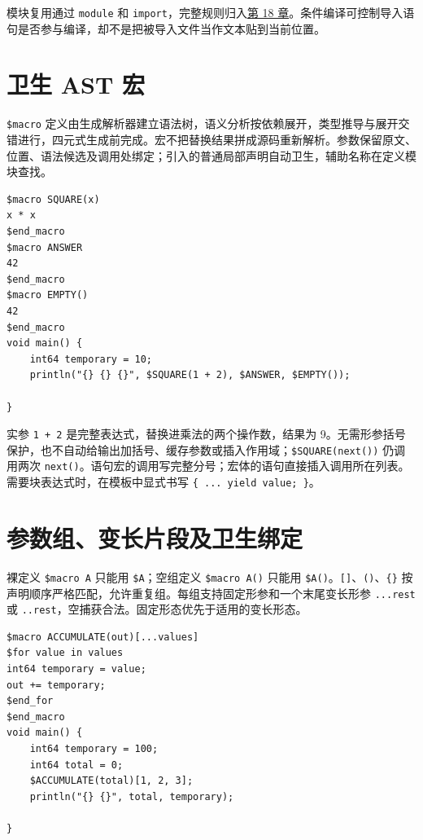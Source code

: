 模块复用通过 \texttt{module} 和 \texttt{import}，完整规则归入\hyperref[ch:18]{第 18 章}。条件编译可控制导入语句是否参与编译，却不是把被导入文件当作文本贴到当前位置。

\section{卫生 AST 宏}

\texttt{\$macro} 定义由生成解析器建立语法树，语义分析按依赖展开，类型推导与展开交错进行，四元式生成前完成。宏不把替换结果拼成源码重新解析。参数保留原文、位置、语法候选及调用处绑定；引入的普通局部声明自动卫生，辅助名称在定义模块查找。

\par
\medskip
\begin{lstlisting}[style=chali]
$macro SQUARE(x)
x * x
$end_macro
$macro ANSWER
42
$end_macro
$macro EMPTY()
42
$end_macro
void main() {
    int64 temporary = 10;
    println("{} {} {}", $SQUARE(1 + 2), $ANSWER, $EMPTY());

}
\end{lstlisting}
\par
\medskip

实参 \texttt{1 + 2} 是完整表达式，替换进乘法的两个操作数，结果为 9。无需形参括号保护，也不自动给输出加括号、缓存参数或插入作用域；\texttt{\$SQUARE(\allowbreak{}next(\allowbreak{})\allowbreak{})\allowbreak{}} 仍调用两次 \texttt{next(\allowbreak{})\allowbreak{}}。语句宏的调用写完整分号；宏体的语句直接插入调用所在列表。需要块表达式时，在模板中显式书写 \texttt{\{ .\allowbreak{}.\allowbreak{}.\allowbreak{} yield value; \}}。

\section{参数组、变长片段及卫生绑定}

裸定义 \texttt{\$macro A} 只能用 \texttt{\$A}；空组定义 \texttt{\$macro A(\allowbreak{})\allowbreak{}} 只能用 \texttt{\$A(\allowbreak{})\allowbreak{}}。\texttt{[\allowbreak{}]\allowbreak{}}、\texttt{(\allowbreak{})\allowbreak{}}、\texttt{\{\}} 按声明顺序严格匹配，允许重复组。每组支持固定形参和一个末尾变长形参 \texttt{.\allowbreak{}.\allowbreak{}.\allowbreak{}rest} 或 \texttt{.\allowbreak{}.\allowbreak{}rest}，空捕获合法。固定形态优先于适用的变长形态。

\par
\medskip
\begin{lstlisting}[style=chali]
$macro ACCUMULATE(out)[...values]
$for value in values
int64 temporary = value;
out += temporary;
$end_for
$end_macro
void main() {
    int64 temporary = 100;
    int64 total = 0;
    $ACCUMULATE(total)[1, 2, 3];
    println("{} {}", total, temporary);

}
\end{lstlisting}
\par
\medskip

